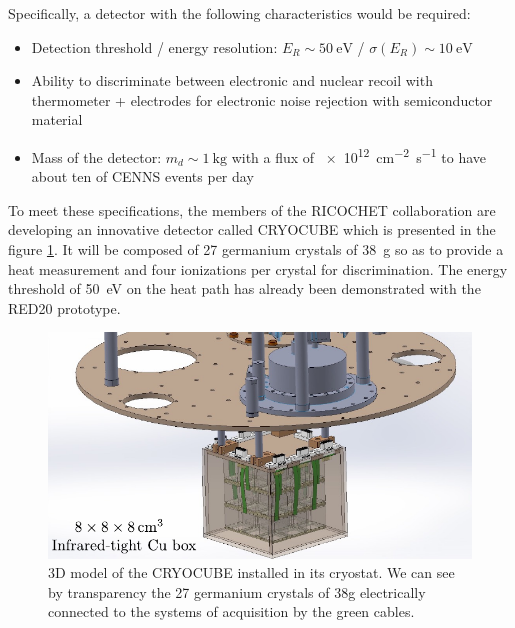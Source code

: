 Specifically, a detector with the following characteristics would be required:
\begin{itemize}
	\item Detection threshold / energy resolution: $E_R \sim \SI{50}{\eV}$ / $\sigma(E_R) \sim \SI{10}{\eV}$
	\item Ability to discriminate between electronic and nuclear recoil with thermometer + electrodes for electronic noise rejection with semiconductor material 
	\item Mass of the detector: $m_d \sim \SI{1}{\kg}$ with a flux of \SI{e12}{\cm^{-2} \s^{-1}} to have about ten of CENNS events per day
\end{itemize}

To meet these specifications, the members of the RICOCHET collaboration are developing an innovative detector called CRYOCUBE which is presented in the figure \ref{fig:cryocube}. It will be composed of 27 germanium crystals of \SI{38}{\g} so as to provide a heat measurement and four ionizations per crystal for discrimination. The energy threshold
of \SI{50}{\eV} on the heat path has already been demonstrated with the RED20 prototype.

\begin{figure}
\centering
\includegraphics[scale=1]{Figures/Introduction/cryocube.pdf}
\caption{3D model of the CRYOCUBE installed in its cryostat. We can see by transparency the 27 germanium crystals of 38g electrically connected to the systems
of acquisition by the green cables.
}
\label{fig:cryocube}
\end{figure}


